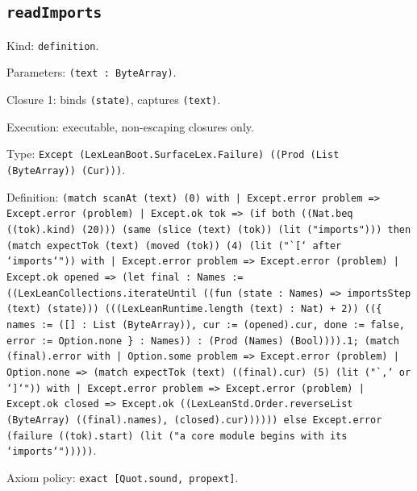 \documentclass[11pt]{article}
\begin{document}
\subsection*{\texttt{readImports}}
\noindent Kind: \texttt{definition}.\par
\noindent Parameters: \texttt{(text : ByteArray)}.\par
\noindent Closure 1: binds \texttt{(state)}, captures \texttt{(text)}.\par
\noindent Execution: executable, non-escaping closures only.\par
\noindent Type: \texttt{Except (LexLeanBoot.SurfaceLex.Failure) ((Prod (List (ByteArray)) (Cur)))}.\par
\noindent Definition: \texttt{(match scanAt (text) (0) with | Except.error problem => Except.error (problem) | Except.ok tok => (if both ((Nat.beq ((tok).kind) (20))) (same (slice (text) (tok)) (lit ("imports"))) then (match expectTok (text) (moved (tok)) (4) (lit ("`[` after `imports`")) with | Except.error problem => Except.error (problem) | Except.ok opened => (let final : Names := ((LexLeanCollections.iterateUntil ((fun (state : Names) => importsStep (text) (state))) (((LexLeanRuntime.length (text) : Nat) + 2)) ((\{ names := ([] : List (ByteArray)), cur := (opened).cur, done := false, error := Option.none \} : Names)) : (Prod (Names) (Bool)))).1; (match (final).error with | Option.some problem => Except.error (problem) | Option.none => (match expectTok (text) ((final).cur) (5) (lit ("`,` or `]`")) with | Except.error problem => Except.error (problem) | Except.ok closed => Except.ok ((LexLeanStd.Order.reverseList (ByteArray) ((final).names), (closed).cur)))))) else Except.error (failure ((tok).start) (lit ("a core module begins with its `imports`")))))}.\par
\noindent Axiom policy: \texttt{exact [Quot.sound, propext]}.\par
\end{document}
